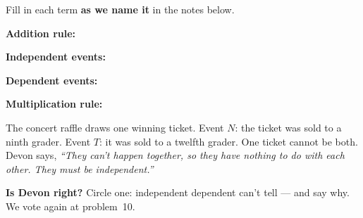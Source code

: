\documentclass[12pt]{article}
\newcommand{\termrowheight}{2.3cm}
\newlength{\termrowinset}\setlength{\termrowinset}{7pt}
\newcommand{\vterm}[1]{%
  \par\noindent\begin{minipage}[t][\termrowheight][t]{\linewidth}%
    \vspace*{\termrowinset}%
    \textbf{\textcolor{cerulean}{#1:}}%
  \end{minipage}\par}
\begin{document}

\vspace{0.15in}

\boxguard[16]
\begin{vocabbox}
\small
Fill in each term \textbf{as we name it} in the notes below.
\vterm{Addition rule}
\vterm{Independent events}
\vterm{Dependent events}
\vterm{Multiplication rule}
\end{vocabbox}

\boxguard[12]
\begin{hookbox}
\small
The concert raffle draws one winning ticket. Event $N$: the ticket was sold to a ninth grader.
Event $T$: it was sold to a twelfth grader. One ticket cannot be both. Devon says,
\emph{``They can't happen together, so they have nothing to do with each other. They must be
independent.''}

\vspace{3pt}
\textbf{Is Devon right?} Circle one: \quad independent \qquad dependent \qquad can't tell
\quad --- and say why. We vote again at problem~10.
\par{}
\end{hookbox}
\end{document}
